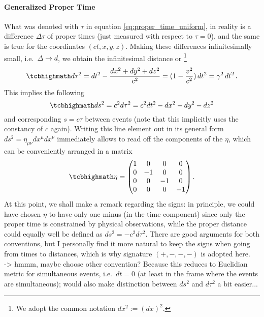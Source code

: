 		\paragraph{Generalized Proper Time}
What was denoted with $\tau$ in equation \eqref{eq:proper_time_uniform}, in reality is a difference $\Delta \tau$ of proper times (just measured with respect to $\tau = 0$), and the same is true for the coordinates $(ct, x, y, z)$. Making these differences infinitesimally small, i.e.~$\Delta \rightarrow d$, we obtain the infinitesimal distance or \footnote{We adopt the common notation $dx^2 := (dx)^2$.}
\begin{equation}
	\eqbox{
	d\tau^2 = dt^2 - \frac{dx^2 + dy^2 + dz^2}{c^2} = (1 - \frac{v^2}{c^2}) \, dt^2 = \gamma^2 \, dt^2
	} \, .
\end{equation}
This implies the following 
\begin{equation}
	\eqbox{
	ds^2 = c^2 d\tau^2 = c^2 dt^2 - dx^2 - dy^2 - dz^2
	}
\end{equation}
and corresponding  $s = c \tau$ between events (note that this implicitly uses the constancy of $c$ again). Writing this line element out in its general form $ds^2 = \eta_{\mu \nu} dx^\mu dx^\nu$ immediately allows to read off the components of the  $\eta$, which can be conveniently arranged in a matrix
\begin{equation}\label{eq:minkowski_metric}
	\eqbox{
	\eta = \mqty(1 & 0 & 0 & 0 \\ 0 & -1 & 0 & 0 \\ 0 & 0 & -1 & 0 \\ 0 & 0 & 0 & -1)
	} \, .
\end{equation}
At this point, we shall make a remark regarding the signs: in principle, we could have chosen $\eta$ to have only one minus (in the time component) since only the proper time is constrained by physical observations, while the proper distance could equally well be defined as $ds^2 = - c^2 d\tau^2$. There are good arguments for both conventions, but I personally find it more natural to keep the signs when going from times to distances, which is why signature $(+, -, -, -)$ is adopted here.\\

-> hmmm, maybe choose other convention? Because this reduces to Euclidian metric for simultaneous events, i.e.~$dt = 0$ (at least in the frame where the events are simultaneous); would also make distinction between $ds^2$ and $d\tau^2$ a bit easier...


